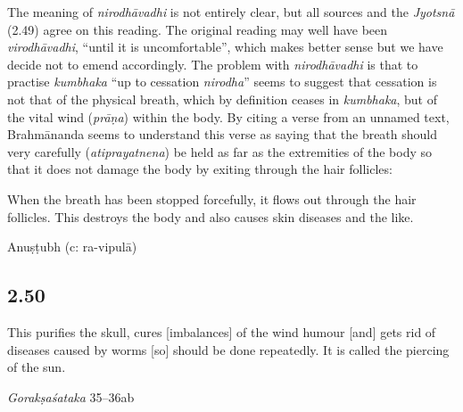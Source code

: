\begin{ekdosis}
\begin{philcomm}[hp02_049]
The meaning of \emph{nirodhāvadhi} is not entirely clear, but all sources and the \emph{Jyotsnā} (2.49) agree on this reading. The original reading may well have been \emph{virodhāvadhi}, “until it is uncomfortable”, which makes better sense but we have decide not to emend accordingly. The problem with \emph{nirodhāvadhi} is that to practise \emph{kumbhaka} ``up to cessation \emph{nirodha}'' seems to suggest that cessation is not that of the physical breath, which by definition ceases in \emph{kumbhaka}, but of the vital wind (\emph{prāṇa}) within the body. By citing a verse from an unnamed text, Brahmānanda seems to understand this verse as saying that the breath should very carefully (\emph{atiprayatnena}) be held as far as the extremities of the body so that it does not damage the body by exiting through the hair follicles:


\begin{versinnote}
When the breath has been stopped forcefully, it flows out through the hair follicles. This destroys the body and also causes skin diseases and the like.
\end{versinnote}

\begin{versinnote}
%
\end{versinnote}
\end{philcomm}

\begin{metre}[hp02_049]
Anuṣṭubh (c: ra-vipulā)
\end{metre}

\subsection*{2.50}
\begin{translation}[hp02_050]
This purifies the skull, cures [imbalances] of the wind humour [and] gets rid of diseases caused by worms [so] should be done repeatedly. It is called the piercing of the sun.
\end{translation}

\begin{sources}[hp02_050]
\emph{Gorakṣaśataka} 35–36ab

\begin{versinnote}
\end{versinnote}
\end{sources}


\end{ekdosis}
